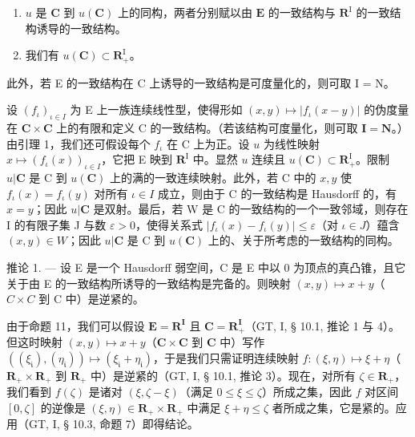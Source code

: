 \begin{enumerate}
\def\labelenumi{\alph{enumi})}
\item
  \(u\) 是 \(\mathbf{C}\) 到 \(u(\mathbf{C})\) 上的同构，两者分别赋以由 \(\mathbf{E}\) 的一致结构与 \(\mathbf{R}^{\mathrm{I}}\) 的一致结构诱导的一致结构。
\item
  我们有 \(u(\mathbf{C}) \subset \mathbf{R}_{+}^{\mathrm{I}}\)。
\end{enumerate}

此外，若 E 的一致结构在 C 上诱导的一致结构是可度量化的，则可取 I = N。

设 \((f_{\iota})_{\iota \in I}\) 为 E 上一族连续线性型，使得形如 \((x, y) \mapsto |f_{\iota}(x - y)|\) 的伪度量在 \(\mathbf{C} \times \mathbf{C}\) 上的有限和定义 C 的一致结构。（若该结构可度量化，则可取 \(\mathbf{I} = \mathbf{N}\)。）由引理 1，我们还可假设每个 \(f_{\iota}\) 在 C 上为正。设 \(u\) 为线性映射 \(x \mapsto (f_{\iota}(x))_{\iota \in I}\)，它把 E 映到 \(\mathbf{R}^{\mathrm{I}}\) 中。显然 \(u\) 连续且 \(u(\mathbf{C}) \subset \mathbf{R}_{+}^{\mathrm{I}}\)。限制 \(u|\mathbf{C}\) 是 C 到 \(u(\mathbf{C})\) 上的满的一致连续映射。此外，若 C 中的 \(x, y\) 使 \(f_{\iota}(x) = f_{\iota}(y)\) 对所有 \(\iota \in I\) 成立，则由于 C 的一致结构是 Hausdorff 的，有 \(x = y\)；因此 \(u|\mathbf{C}\) 是双射。最后，若 W 是 C 的一致结构的一个一致邻域，则存在 I 的有限子集 J 与数 \(\varepsilon > 0\)，使得关系式 \(|f_{\iota}(x) - f_{\iota}(y)| \leqslant \varepsilon\)（对 \(\iota \in J\)）蕴含 \((x, y) \in W\)；因此 \(u|\mathbf{C}\) 是 C 到 \(u(\mathbf{C})\) 上的、关于所考虑的一致结构的同构。

推论 1. --- 设 E 是一个 Hausdorff 弱空间，C 是 E 中以 0 为顶点的真凸锥，且它关于由 E 的一致结构所诱导的一致结构是完备的。则映射 \((x, y) \mapsto x + y\)（\(C \times C\) 到 C 中）是逆紧的。

由于命题 11，我们可以假设 \(\mathbf{E} = \mathbf{R}^{\mathbf{I}}\) 且 \(\mathbf{C} = \mathbf{R}_{+}^{\mathbf{I}}\)（GT, I, § 10.1, 推论 1 与 4）。但这时映射 \((x, y) \mapsto x + y\)（\(\mathbf{C} \times \mathbf{C}\) 到 \(\mathbf{C}\) 中）写作 \(((\xi_{\mathfrak{i}}), (\eta_{\mathfrak{i}})) \mapsto (\xi_{\mathfrak{i}} + \eta_{\mathfrak{i}})\)，于是我们只需证明连续映射 \(f: (\xi, \eta) \mapsto \xi + \eta\)（\(\mathbf{R}_{+} \times \mathbf{R}_{+}\) 到 \(\mathbf{R}_{+}\) 中）是逆紧的（GT, I, § 10.1, 推论 3）。现在，对所有 \(\zeta \in \mathbf{R}_{+}\)，我们看到 \(f(\zeta)\) 是诸对 \((\xi, \zeta - \xi)\)（满足 \(0 \leqslant \xi \leqslant \zeta\)）所成之集，因此 \(f\) 对区间 \([0, \zeta]\) 的逆像是 \((\xi, \eta) \in \mathbf{R}_{+} \times \mathbf{R}_{+}\) 中满足 \(\xi + \eta \leqslant \zeta\) 者所成之集，它是紧的。应用（GT, I, § 10.3, 命题 7）即得结论。

